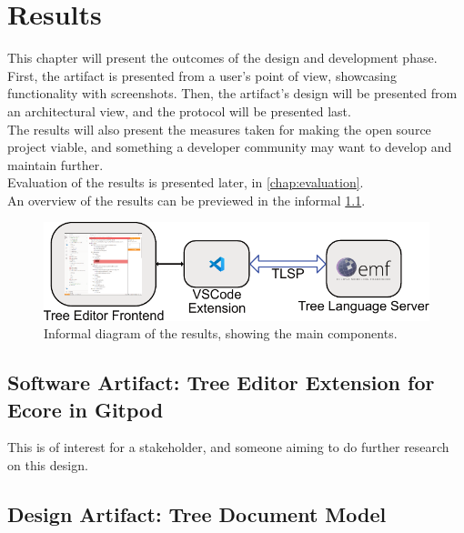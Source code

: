 \chapter{Results}\label{chap:results}

This chapter will present the outcomes of the design and development phase.
First, the artifact is presented from a user's point of view, showcasing functionality with screenshots.
Then, the artifact's design will be presented from an architectural view, and the protocol will be presented last.\\

The results will also present the measures taken for making the \gls{open source} project viable, and something a developer community may want to develop and maintain further.\\

Evaluation of the results is presented later, in \cref{chap:evaluation}.\\

An overview of the results can be previewed in the informal \cref{fig:results-overview}.

\begin{figure}[H]  %
  \centering
  \includegraphics[width=\textwidth]{figures/result_overview.pdf}
  \caption[Overview of Results]{Informal diagram of the results, showing the main components.}\label{fig:results-overview}
\end{figure}

\section{Software Artifact: Tree Editor Extension for Ecore in Gitpod}

This is of interest for a stakeholder, and someone aiming to do further research on this design.



\section{Design Artifact: Tree Document Model}

